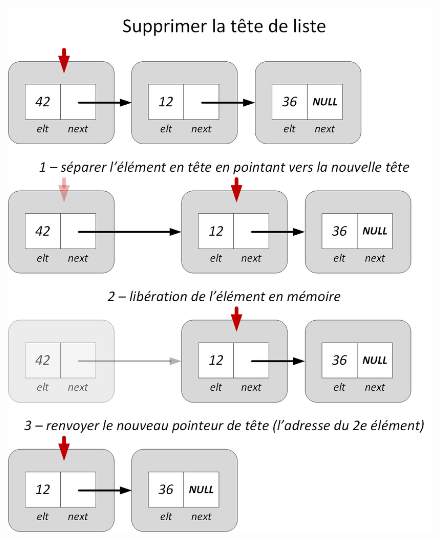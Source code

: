 \documentclass[11pt,a4paper]{article}
\begin{document}
\begin{figure}[ht!]
\centering
\centerline{   %
\includegraphics[scale=0.85]{img/listes/Listes_Pointeurs_4_2_suppression_tete.png}
}
\end{figure}

\vfillLast

\clearpage

\vfillFirst
\end{document}
